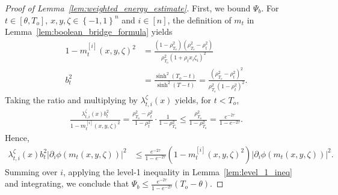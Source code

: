 \documentclass[10pt,a4paper]{amsart}
\newcommand{\To}{{T_o}}
\newcommand{\abss}[1]{\left| #1 \right |}
\newcommand{\braces}[1]{\left\{ #1 \right \}}
\newcommand{\parenth}[1]{\left( #1 \right)}
\begin{document}
\begin{proof}[Proof of Lemma~\ref{lem:weighted_energy_estimate}]
  First, we bound $\Psi_b$. For $t \in [\theta, \To]$, $x, y, \zeta \in \braces{-1, 1}^n$ and $i \in [n]$, the definition of $m_t$ in Lemma~\ref{lem:boolean_bridge_formula} yields 
  \begin{align*}
    1- m_t^{[i]}(x, y, \zeta)^2 &= \frac{(1-\rho_{\To}^2)(\rho_{\To}^2 - \rho_t^2)} {\rho_{\To}^2 (1+\rho_t x_i \zeta_i)^2} \\
    b_t^2 &= \frac{\sinh^2(\To-t)}{\sinh^2(T-t)} = \frac{(\rho_{\To}^2 - \rho_t^2)^2}{\rho_{\To}^2 (1-\rho_t^2)^2}.
  \end{align*}
  Taking the ratio and multiplying by $\lambda_{t, i}^{\zeta}(x)$ yields, for $t < \To$,
  \begin{align*}
    \frac{\lambda_{t, i}^{\zeta}(x) b_t^2}{1- m_t^{[i]}(x, y, \zeta)^2} = \frac{ \rho_{\To}^2 - \rho_t^2}{1-\rho_t^2} \cdot \frac{1}{1-\rho_{\To}^2} \leq \frac{\rho_{\To}^2}{1-\rho_{\To}^2} = \frac{e^{-2\tau}}{1-e^{-2\tau}}.
  \end{align*}
  Hence,
  \begin{align*}
    \lambda_{t, i}^{\zeta}(x) b_t^2 \abss{\partial_i \phi(m_t(x, y, \zeta))}^2 &\leq \frac{e^{-2\tau}}{1-e^{-2\tau}} \parenth{1- m_t^{[i]}(x, y, \zeta)^2} \abss{\partial_i \phi(m_t(x, y, \zeta))}^2.
  \end{align*}
  Summing over $i$, applying the level-1 inequality in Lemma~\ref{lem:level_1_ineq} and integrating, we conclude that $\Psi_b \leq \frac{e^{-2\tau}}{1-e^{-2\tau}} (\To - \theta)$.


\end{proof}
\end{document}
